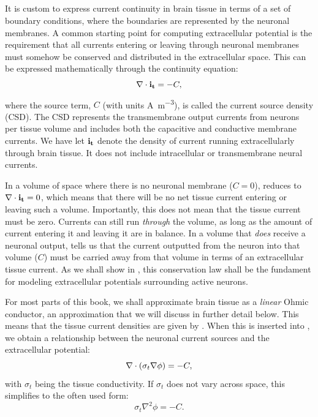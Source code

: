 \subsection{}
\label{sec:Basics:C} 
It is custom to express current continuity in brain tissue in terms of a set of boundary conditions, where the boundaries are represented by the neuronal membranes. A common starting point for computing extracellular potential is the requirement that 
all currents entering or leaving through neuronal membranes must somehow be conserved and distributed in the extracellular space. This can be expressed mathematically through the continuity equation:
\begin{equation}
{\bf \nabla} \cdot {\bf i_t} = -C, 
\label{eq:Basics:continuity1}
\end{equation}
where the source term, $C$ (with units \si{\ampere\per\cubic\metre}), is called the current source density (CSD). The CSD represents the transmembrane output currents from neurons per tissue volume and includes both the capacitive and conductive membrane currents. We have let ${\bf i_t}$ denote the density of current running extracellularly through brain tissue. It does not include intracellular or transmembrane neural currents. 

In a volume of space where there is no neuronal membrane ($C = 0$),  reduces to ${\bf \nabla} \cdot {\bf i_t} = 0$, which means that there will be no net tissue current entering or leaving such a volume. Importantly, this does not mean that the tissue current must be zero. Currents can still run \textit{through} the volume, as long as the amount of current entering it and leaving it are in balance. In a volume that \textit{does} receive a neuronal output,  tells us that the current outputted from the neuron into that volume ($C$) must be carried away from that volume in terms of an extracellular tissue current. As we shall show in , this conservation law shall be the fundament for modeling extracellular potentials surrounding active neurons.

For most parts of this book, we shall approximate brain tissue as a \textit{linear} Ohmic conductor, an approximation that we will discuss in further detail below. This means that the tissue current densities are given by . When this is inserted into , we obtain a relationship between the neuronal current sources and the extracellular potential: 
\begin{equation}
{\bf \nabla} \cdot \left(\sigma_t {\bf \nabla} {\phi} \right) = -C, 
\label{eq:Basics:continuity2}
\end{equation}
with $\sigma_t$ being the tissue conductivity. If $\sigma_t$ does not vary across space, this simplifies to the often used form:
\begin{equation}
\sigma_t \nabla^2{\phi} = -C.
\label{eq:Basics:continuity3}
\end{equation}


